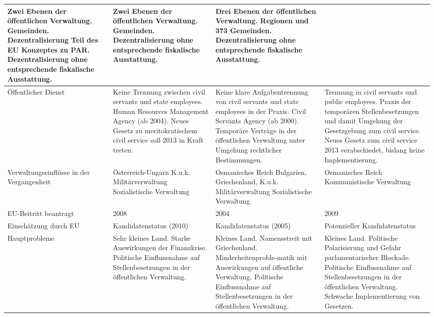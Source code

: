 \begin{footnotesize}
\begin{longtable}[H]{|M{26mm}|C{34mm}|C{34mm}|C{34mm}|}
Zwei Ebenen der öffentlichen Verwaltung. Gemeinden.
Dezentralisierung Teil des EU Konzeptes zu PAR.
Dezentralisierung ohne entsprechende fiskalische Ausstattung.&
Zwei Ebenen der öffentlichen Verwaltung.  Gemeinden.
Dezentralisierung ohne entsprechende fiskalische Ausstattung. &
Drei Ebenen der öffentlichen Verwaltung. Regionen und 373 Gemeinden.
Dezentralisierung ohne entsprechende fiskalische Ausstattung. \\\hline
Öffentlicher Dienst&
Keine Trennung zwischen civil servants und state employees.\newline
Human Resources Management Agency 
(ab 2004).\newline
Neues Gesetz zu meritokratischem civil service soll 2013 in Kraft treten.&
 Keine klare Aufgabentrennung von civil servants und state employees in der Praxis.\newline
Civil Servants Agency (ab 2000).
Temporäre Verträge in der öffentlichen Verwaltung unter Umgehung rechtlicher Bestimmungen.&
Trennung in civil servants und public employees. \newline
Praxis der temporären Stellenbesetzungen und damit Umgehung der Gesetzgebung zum civil service.\newline
Neues Gesetz zum civil service 2013 verabschiedet, bislang keine Implementierung.\\\hline
Verwaltungseinflüsse in der Vergangenheit&
Österreich-Ungarn
K.u.k. Militärverwaltung
Sozialistische Verwaltung &
Osmanisches Reich 
Bulgarien, Griechenland, 
K.u.k. Militärverwaltung
Sozialistische Verwaltung &
Osmanisches Reich 
Kommunistische Verwaltung \\\hline
EU-Beitritt beantragt&
2008&
2004&
2009\\\hline
Einschätzung durch EU&Kandidatenstatus (2010)&
Kandidatenstatus (2005)&
Potenzieller Kandidatenstatus\\\hline
Hauptprobleme&
Sehr kleines Land.
Starke Auswirkungen der Finanzkrise.
Politische Einflussnahme auf Stellenbesetzungen in der öffentlichen Verwaltung.&
Kleines Land.
Namensstreit mit Griechenland.\newline
Minderheitenproble-matik mit Auswirkungen auf öffentliche Verwaltung.
Politische Einflussnahme auf Stellenbesetzungen in der öffentlichen Verwaltung.&
Kleines Land.
Politische Polarisierung und Gefahr parlamentarischer Blockade.\newline
Politische Einflussnahme auf Stellenbesetzungen in der öffentlichen Verwaltung.
Schwache Implementierung von Gesetzen.\\\hline
\end{longtable}
\end{footnotesize}

